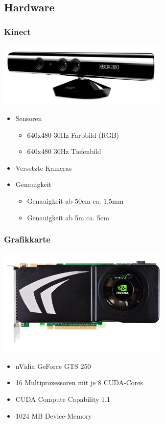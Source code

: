 \documentclass[compress]{beamer}
\begin{document}
\subsection{Hardware}

\begin{frame}
\frametitle{Kinect}

\hspace*{1.8cm}\includegraphics[width=8.5cm]{kin.jpg}

\begin{itemize}
	\item Sensoren
	\begin{itemize}
		\item 640x480 \@ 30Hz Farbbild (RGB)
		\item 640x480 \@ 30Hz Tiefenbild
	\end{itemize}
    \item Versetzte Kameras
	\item Genauigkeit
	\begin{itemize}
		\item Genauigkeit ab 50cm ca. 1,5mm
		\item Genauigkeit ab 5m ca. 5cm
	\end{itemize}
\end{itemize}
\end{frame}

\begin{frame}
\frametitle{Grafikkarte}

\hspace*{1.8cm}\includegraphics[width=8.5cm]{gts250.png}

\begin{itemize}
	\item nVidia GeForce GTS 250
	\item 16 Multiprozessoren mit je 8 CUDA-Cores
    \item CUDA Compute Capability 1.1
	\item 1024 MB Device-Memory	
\end{itemize}
\end{frame}
\end{document}
